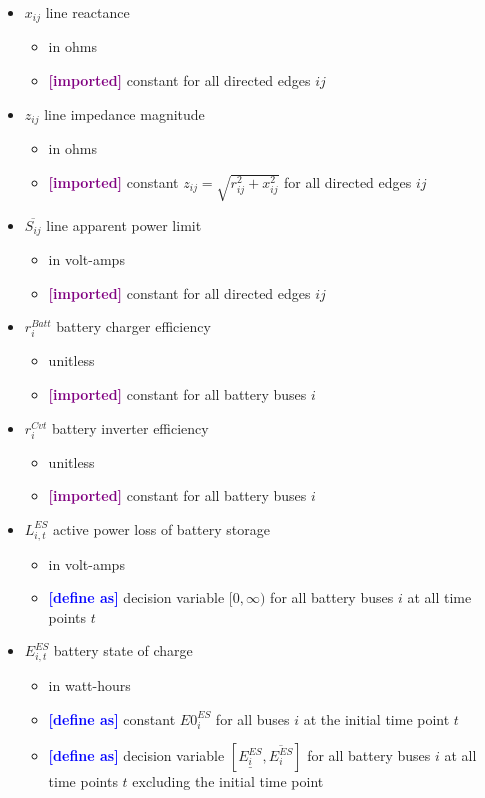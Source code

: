 \documentclass{article}
\newcommand{\lo}[1]{\underline{#1}}
\newcommand{\hi}[1]{\overline{#1}}
\newcommand{\define}{\textcolor{blue}{\textbf{[define as] }}}
\newcommand{\imported}{\textcolor{purple}{\textbf{[imported] }}}
\begin{document}
\begin{itemize}
\item $x_{ij}$ line reactance
  \begin{itemize}
  \item in ohms
  \item \imported constant for all directed edges $ij$
  \end{itemize}

\item $z_{ij}$ line impedance magnitude
  \begin{itemize}
  \item in ohms
  \item \imported constant $z_{ij} = \sqrt{r^2_{ij} + x^2_{ij}}$ for all
    directed edges $ij$
  \end{itemize}

\item $\hi{S_{ij}}$ line apparent power limit
  \begin{itemize}
  \item in volt-amps
  \item \imported constant for all directed edges $ij$
  \end{itemize}

\item $r^{Batt}_i$ battery charger efficiency
  \begin{itemize}
  \item unitless
  \item \imported constant for all battery buses $i$
  \end{itemize}

\item $r^{Cvt}_i$ battery inverter efficiency
  \begin{itemize}
  \item unitless
  \item \imported constant for all battery buses $i$
  \end{itemize}

\item $L^{ES}_{i,t}$ active power loss of battery storage
  \begin{itemize}
  \item in volt-amps
  \item \define decision variable $[0, \infty)$ for all battery buses $i$ at all
    time points $t$
  \end{itemize}

\item $E^{ES}_{i,t}$ battery state of charge
  \begin{itemize}
  \item in watt-hours
  \item \define constant $E0^{ES}_i$ for all buses $i$ at the initial time point
    $t$
  \item \define decision variable $[\lo{E^{ES}_i}, \hi{E^{ES}_i}]$ for all
    battery buses $i$ at all time points $t$ excluding the initial time point
  \end{itemize}


\end{itemize}
\end{document}
